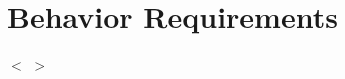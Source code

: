 \documentclass[16pt]{scrreprt}
\begin{document}
\section{Behavior Requirements}
$<$ $>$


\end{document}
